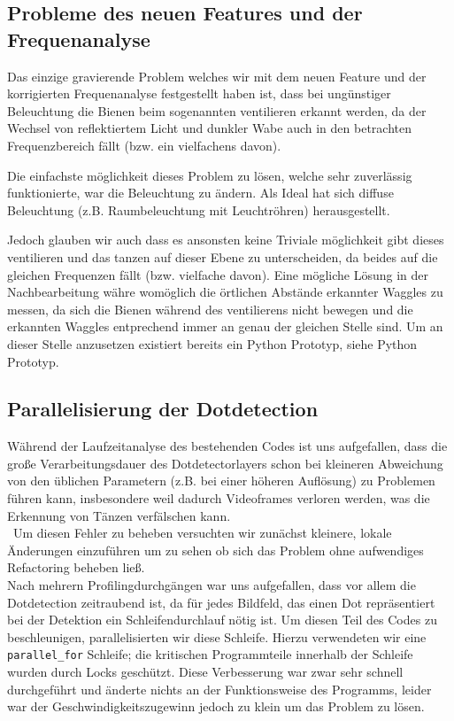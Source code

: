 \documentclass[11pt,a4paper]{article}
\begin{document}
\subsection{Probleme des neuen Features und der Frequenanalyse}
Das einzige gravierende Problem welches wir mit dem neuen Feature und der korrigierten Frequenanalyse festgestellt haben ist, dass bei ungünstiger Beleuchtung die Bienen beim sogenannten ventilieren erkannt werden, da der Wechsel von reflektiertem Licht und dunkler Wabe auch in den betrachten Frequenzbereich fällt (bzw. ein vielfachens davon).

Die einfachste möglichkeit dieses Problem zu lösen, welche sehr zuverlässig funktionierte, war die Beleuchtung zu ändern. Als Ideal hat sich diffuse Beleuchtung (z.B. Raumbeleuchtung mit Leuchtröhren) herausgestellt.

Jedoch glauben wir auch dass es ansonsten keine Triviale möglichkeit gibt dieses ventilieren und das tanzen auf dieser Ebene zu unterscheiden, da beides auf die gleichen Frequenzen fällt (bzw. vielfache davon). Eine mögliche Lösung in der Nachbearbeitung währe womöglich die örtlichen Abstände erkannter Waggles zu messen, da sich die Bienen während des ventilierens nicht bewegen und die erkannten Waggles entprechend immer an genau der gleichen Stelle sind. Um an dieser Stelle anzusetzen existiert bereits ein Python Prototyp, siehe Python Prototyp.

\subsection{Parallelisierung der Dotdetection}%

Während der Laufzeitanalyse des bestehenden Codes ist uns aufgefallen, dass die große Verarbeitungsdauer des Dotdetectorlayers schon bei kleineren Abweichung von den üblichen Parametern (z.B. bei einer höheren Auflösung) zu Problemen führen kann, insbesondere weil dadurch Videoframes verloren werden, was die Erkennung von Tänzen verfälschen kann.\\\
Um diesen Fehler zu beheben versuchten wir zunächst kleinere, lokale Änderungen einzuführen um zu sehen ob sich das Problem ohne aufwendiges Refactoring beheben ließ.\\
Nach mehrern Profilingdurchgängen war uns aufgefallen, dass vor allem die Dotdetection zeitraubend ist, da für jedes Bildfeld, das einen Dot repräsentiert bei der Detektion ein Schleifendurchlauf nötig ist.
Um diesen Teil des Codes zu beschleunigen, parallelisierten wir diese Schleife.
Hierzu verwendeten wir eine {\tt parallel\_for} Schleife; die kritischen Programmteile innerhalb der Schleife wurden durch Locks geschützt.
Diese Verbesserung war zwar sehr schnell durchgeführt und änderte nichts an der Funktionsweise des Programms, leider war der Geschwindigkeitszugewinn jedoch zu klein um das Problem zu lösen.\\
\end{document}
